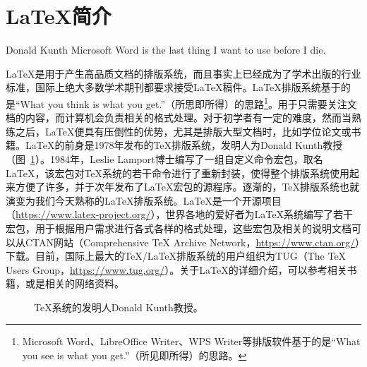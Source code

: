 \section{{\LaTeX}简介}


\begin{WUTquote}{Donald Kunth}
Microsoft Word is the last thing I want to use before I die.
\end{WUTquote}


\par {\LaTeX}是用于产生高品质文档的排版系统，而且事实上已经成为了学术出版的行业标准，国际上绝大多数学术期刊都要求接受{\LaTeX}稿件。{\LaTeX}排版系统基于的是“What you think is what you get.”（所思即所得）的思路\footnote{Microsoft Word、LibreOffice Writer、WPS Writer等排版软件基于的是“What you see is what you get.”（所见即所得）的思路。}。用于只需要关注文档的内容，而计算机会负责相关的格式处理。对于初学者有一定的难度，然而当熟练之后，{\LaTeX}便具有压倒性的优势，尤其是排版大型文档时，比如学位论文或书籍。{\LaTeX}的前身是1978年发布的{\TeX}排版系统，发明人为Donald Kunth教授（图~\ref{fig_Knuth}）。1984年，Leslie Lamport博士编写了一组自定义命令宏包，取名LaTeX，该宏包对{\TeX}系统的若干命令进行了重新封装，使得整个排版系统使用起来方便了许多，并于次年发布了LaTeX宏包的源程序。逐渐的，{\TeX}排版系统也就演变为我们今天熟称的{\LaTeX}排版系统。{\LaTeX}是一个开源项目（\url{https://www.latex-project.org/}），世界各地的爱好者为{\LaTeX}系统编写了若干宏包，用于根据用户需求进行各式各样的格式处理，这些宏包及相关的说明文档可以从CTAN网站（Comprehensive {\TeX} Archive Network，\url{https://www.ctan.org/}）下载。目前，国际上最大的{\TeX}/{\LaTeX}排版系统的用户组织为TUG（The TeX Users Group，\url{https://www.tug.org/}）。关于{\LaTeX}的详细介绍，可以参考相关书籍\cite{Hu_2013, Liu_2013, Knuth_1986, Mittelbach_2004}，或是相关的网络资料。



\begin{figure}
\begin{center}
\begin{minipage}[t]{0.7\hsize}
\end{minipage}
\end{center}
\caption{{\TeX}系统的发明人Donald Kunth教授。}
\label{fig_Knuth}
\end{figure}





